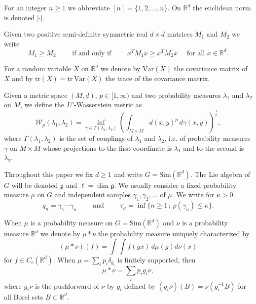 \documentclass[10pt, english,oneside,reqno]{amsart}
\theoremstyle{plain}
\theoremstyle{remark}
\numberwithin{equation}{section}
\numberwithin{figure}{section}
\newcommand{\tr}{\mathrm{tr}}
\newcommand{\R}{\mathbb{R}}
\begin{document}
For an integer $n \geq 1$ we abbreviate $[n] = \{ 1,2,\ldots , n \}$. On $\R^d$ the euclidean norm is denoted $|\cdot|$.

Given two positive semi-definite symmetric real $d \times d$ matrices $M_1$ and $M_2$ we write 
\begin{equation}\label{MatrixPartialOrder}
    M_1 \geq M_2 \quad\quad \text{ if and only if } \quad\quad x^TM_1 x \geq x^TM_2 x \quad \text{ for all } x \in \R^d.
\end{equation}

For a random variable $X$ on $\R^d$ we denote by $\mathrm{Var}(X)$ the covariance matrix of $X$ and by $\mathrm{tr}(X) = \tr\, \mathrm{Var}(X)$ the trace of the covariance matrix.

Given a metric space $(M,d)$, $p \in [1,\infty)$ and two probability measures $\lambda_1$ and $\lambda_2$ on $M$, we define the $L^p$-Wasserstein metric as
\begin{equation}\label{WassersteinDef}
    \mathcal{W}_p(\lambda_1, \lambda_2) = \inf_{\gamma \in \Gamma(\lambda_1,\lambda_2)} \left( \int_{M\times M} d(x,y)^p \, d\gamma(x,y)\right)^{\frac{1}{p}},
\end{equation}
where $\Gamma(\lambda_1,\lambda_2)$ is the set of couplings of $\lambda_1$ and $\lambda_2$, i.e. of probability measures $\gamma$ on $M \times M$ whose projections to the first coordinate is $\lambda_1$ and to the second is $\lambda_2$. 


Throughout this paper we fix $d \geq 1$ and write $G = \mathrm{Sim}(\R^d)$. The Lie algebra of $G$ will be denoted $\mathfrak{g}$ and $\ell = \dim \mathfrak{g}$. We usually consider a fixed probability measure $\mu$ on $G$ and independent samples $\gamma_1, \gamma_2, \ldots$ of $\mu$.  We write for $\kappa > 0$ $$q_n = \gamma_1\cdots \gamma_n \quad\quad  \text{ and } \quad\quad  \tau_{\kappa} = \inf\{ n \geq 1 \,;\, \rho(\gamma_n) \leq \kappa \}.$$

When $\mu$ is a probability measure on $G = \mathrm{Sim}(\R^d)$ and $\nu$ is a probability measure $\R^d$ we denote by $\mu * \nu$ the probability measure uniquely characterized by $$(\mu*\nu)(f) = \int\int f(gx) \, d\mu(g)d\nu(x)$$ for $f\in C_c(\R^d)$. When $\mu = \sum_{i}p_i \delta_{g_i}$ is finitely supported, then 
\begin{equation}\label{Equation:ConcreteConvolution}
    \mu * \nu = \sum_{i} p_i g_i\nu,
\end{equation}
where $g_i\nu$ is the pushforward of $\nu$ by $g_i$ defined by $(g_i\nu)(B) = \nu(g_i^{-1}B)$ for all Borel sets $B \subset \R^d$.
\end{document}
